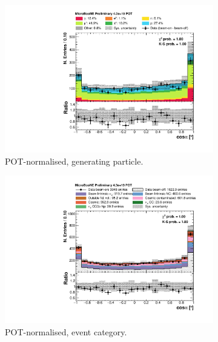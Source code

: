 \begin{figure}[htbp]
\centering
  \begin{subfigure}{0.49\textwidth}
    \includegraphics[width=\linewidth]{figures/h_track_shower_angle_pdg.pdf}
    \caption{POT-normalised, generating particle.} \label{fig:angle_pdg}
  \end{subfigure}
  \begin{subfigure}{0.49\textwidth}
    \includegraphics[width=\linewidth]{figures/h_track_shower_angle.pdf}
    \caption{POT-normalised, event category.} \label{fig:angle_pot}
  \end{subfigure}
    \begin{subfigure}{0.49\textwidth}

\end{subfigure}
\end{figure}
